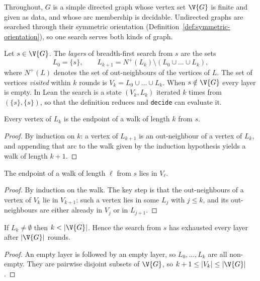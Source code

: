 Throughout, $G$ is a simple directed graph whose vertex set $\V{G}$ is finite and given as
data, and whose arc membership is decidable. Undirected graphs are searched through their
symmetric orientation (Definition~\ref{def:symmetric-orientation}), so one search serves
both kinds of graph.

\begin{definition}
  \label{def:bfs-layers}
  \leanok
  Let $s \in \V{G}$. The \emph{layers} of breadth-first search from $s$ are the sets
  \[
    L_0 = \{s\}, \qquad
    L_{k+1} = N^+(L_k) \setminus (L_0 \cup \dots \cup L_k),
  \]
  where $N^+(L)$ denotes the set of out-neighbours of the vertices of $L$. The set of
  vertices \emph{visited} within $k$ rounds is $V_k = L_0 \cup \dots \cup L_k$. When
  $s \notin \V{G}$ every layer is empty.
  In Lean the search is a state $(V_k, L_k)$ iterated $k$ times from $(\{s\}, \{s\})$,
  so that the definition reduces and \texttt{decide} can evaluate it.
\end{definition}

\begin{lemma}[Soundness]
  \label{lem:bfs-sound}
  \leanok
  Every vertex of $L_k$ is the endpoint of a walk of length $k$ from $s$.
\end{lemma}
\begin{proof}
  \leanok
  By induction on $k$: a vertex of $L_{k+1}$ is an out-neighbour of a vertex of $L_k$,
  and appending that arc to the walk given by the induction hypothesis yields a walk of
  length $k + 1$.
\end{proof}

\begin{lemma}[Completeness]
  \label{lem:bfs-complete}
  \leanok
  The endpoint of a walk of length $\ell$ from $s$ lies in $V_\ell$.
\end{lemma}
\begin{proof}
  \leanok
  By induction on the walk. The key step is that the out-neighbours of a vertex of $V_k$
  lie in $V_{k+1}$: such a vertex lies in some $L_j$ with $j \le k$, and its
  out-neighbours are either already in $V_j$ or in $L_{j+1}$.
\end{proof}

\begin{lemma}[Termination]
  \label{lem:bfs-termination}
  \leanok
  If $L_k \neq \emptyset$ then $k < |\V{G}|$. Hence the search from $s$ has exhausted every
  layer after $|\V{G}|$ rounds.
\end{lemma}
\begin{proof}
  \leanok
  An empty layer is followed by an empty layer, so $L_0, \dots, L_k$ are all non-empty.
  They are pairwise disjoint subsets of $\V{G}$, so $k + 1 \le |V_k| \le |\V{G}|$.
\end{proof}

